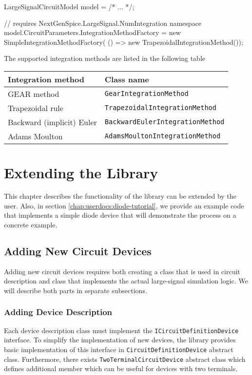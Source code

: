 \begin{csharpcode}
LargeSignalCircuitModel model = /* ... */;

// requires NextGenSpice.LargeSignal.NumIntegration namespace
model.CircuitParameters.IntegrationMethodFactory =
	new SimpleIntegrationMethodFactory(
		() => new TrapezoidalIntegrationMethod());
\end{csharpcode}

The supported integration methods are listed in the following table

\begin{center}
	\begin{tabular}{|l|l|}
		\hline
		Integration method & Class name \\ \hline \hline
		GEAR method & \texttt{GearIntegrationMethod} \\ \hline
		Trapezoidal rule & \texttt{TrapezoidalIntegrationMethod} \\ \hline
		Backward (implicit) Euler & \texttt{BackwardEulerIntegrationMethod} \\ \hline
		Adams Moulton & \texttt{AdamsMoultonIntegrationMethod} \\ \hline
	\end{tabular}
\end{center}

\chapter{Extending the Library}
\label{chap:exteding}
This chapter describes the functionality of the library can be extended by the user. Also, in section \ref{chap:userdocs:diode-tutorial}, we provide an example code that implements a simple diode device that will demonstrate the process on a concrete example.

\section{Adding New Circuit Devices}
Adding new circuit devices requires both creating a class that is used in circuit description and class that implements the actual large-signal simulation logic. We will describe both parts in separate subsections.

\subsection{Adding Device Description}

Each device description class must implement the \texttt{ICircuitDefinitionDevice} interface. To simplify the implementation of new devices, the library provides basic implementation of this interface in \texttt{CircuitDefinitionDevice} abstract class. Furthermore, there exists \texttt{TwoTerminalCircuitDevice} abstract class which defines additional member which can be useful for devices with two terminals. 

